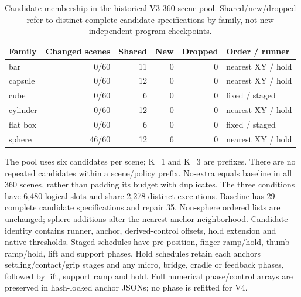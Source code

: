 \begin{table}[h]\centering\small
\caption{Candidate membership in the historical V3 360-scene pool. Shared/new/dropped refer to distinct complete candidate specifications by family, not new independent program checkpoints.}
\begin{tabular}{lrrrrl}\toprule Family & Changed scenes & Shared & New & Dropped & Order / runner\\\midrule
bar & 0/60 & 11 & 0 & 0 & nearest XY / hold \\
capsule & 0/60 & 12 & 0 & 0 & nearest XY / hold \\
cube & 0/60 & 6 & 0 & 0 & fixed / staged \\
cylinder & 0/60 & 12 & 0 & 0 & nearest XY / hold \\
flat box & 0/60 & 6 & 0 & 0 & fixed / staged \\
sphere & 46/60 & 12 & 6 & 0 & nearest XY / hold \\
\bottomrule\end{tabular}\end{table}
The pool uses six candidates per scene; K=1 and K=3 are prefixes. There are no repeated candidates within a scene/policy prefix. No-extra equals baseline in all 360 scenes, rather than padding its budget with duplicates. The three conditions have 6,480 logical slots and share 2,278 distinct executions. Baseline has 29 complete candidate specifications and repair 35. Non-sphere ordered lists are unchanged; sphere additions alter the nearest-anchor neighborhood.
Candidate identity contains runner, anchor, derived-control offsets, hold extension and native thresholds. Staged schedules have pre-position, finger ramp/hold, thumb ramp/hold, lift and support phases. Hold schedules retain each anchor\textquotesingle s settling/contact/grip stages and any micro, bridge, cradle or feedback phases, followed by lift, support ramp and hold. Full numerical phase/control arrays are preserved in hash-locked anchor JSONs; no phase is refitted for V4.
